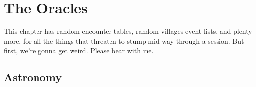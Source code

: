 \chapter{The Oracles}
\label{encounters}

This chapter has random encounter tables, random \glspl{village} event lists, and plenty more, for all the things that threaten to stump  mid-way through a session.
But first, we're gonna get weird.
Please bear with me.



\section{Astronomy}

\label{astronomy}
\label{seasons}

